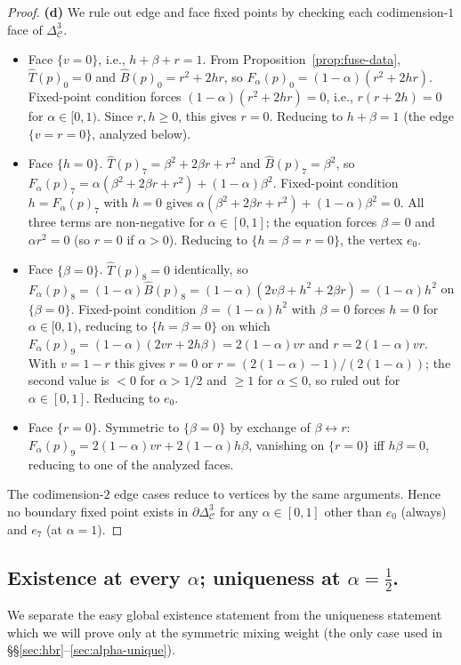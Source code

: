 \documentclass[11pt,reqno]{amsart}
\theoremstyle{plain}
\theoremstyle{definition}
\theoremstyle{remark}
\newcommand{\Cfour}{\mathcal{C}}
\newcommand{\Tfuse}{\widehat{T}}
\newcommand{\Bfuse}{\widehat{B}}
\begin{document}
\begin{proof}
\textbf{(d)} We rule out edge and face fixed points by checking
each codimension-$1$ face of $\Delta^{3}_{\Cfour}$.
\begin{itemize}\setlength\itemsep{0pt}
\item Face $\{v = 0\}$, i.e., $h + \beta + r = 1$. From
Proposition~\ref{prop:fuse-data}, $\Tfuse(p)_{0} = 0$ and
$\Bfuse(p)_{0} = r^{2} + 2hr$, so $F_{\alpha}(p)_{0} =
(1-\alpha)(r^{2} + 2hr)$. Fixed-point condition forces
$(1-\alpha)(r^{2} + 2hr) = 0$, i.e., $r(r + 2h) = 0$ for
$\alpha\in[0, 1)$. Since $r, h\geq 0$, this gives $r = 0$.
Reducing to $h + \beta = 1$ (the edge $\{v = r = 0\}$,
analyzed below).
\item Face $\{h = 0\}$. $\Tfuse(p)_{7} = \beta^{2} + 2\beta r +
r^{2}$ and $\Bfuse(p)_{7} = \beta^{2}$, so $F_{\alpha}(p)_{7} =
\alpha(\beta^{2} + 2\beta r + r^{2}) + (1-\alpha)\beta^{2}$.
Fixed-point condition $h = F_{\alpha}(p)_{7}$ with $h = 0$
gives $\alpha(\beta^{2} + 2\beta r + r^{2}) +
(1-\alpha)\beta^{2} = 0$. All three terms are non-negative for
$\alpha\in[0, 1]$; the equation forces $\beta = 0$ and
$\alpha r^{2} = 0$ (so $r = 0$ if $\alpha > 0$). Reducing to
$\{h = \beta = r = 0\}$, the vertex $e_{0}$.
\item Face $\{\beta = 0\}$. $\Tfuse(p)_{8} = 0$ identically, so
$F_{\alpha}(p)_{8} = (1-\alpha)\Bfuse(p)_{8} =
(1-\alpha)(2v\beta + h^{2} + 2\beta r) =
(1-\alpha)h^{2}$ on $\{\beta = 0\}$. Fixed-point condition
$\beta = (1-\alpha)h^{2}$ with $\beta = 0$ forces $h = 0$ for
$\alpha\in[0, 1)$, reducing to $\{h = \beta = 0\}$ on which
$F_{\alpha}(p)_{9} = (1-\alpha)(2vr + 2h\beta) =
2(1-\alpha)vr$ and $r = 2(1-\alpha)vr$. With $v = 1 - r$ this
gives $r = 0$ or $r = (2(1-\alpha) - 1)/(2(1-\alpha))$; the
second value is $< 0$ for $\alpha > 1/2$ and $\geq 1$ for
$\alpha \leq 0$, so ruled out for $\alpha\in[0, 1]$. Reducing
to $e_{0}$.
\item Face $\{r = 0\}$. Symmetric to $\{\beta = 0\}$ by exchange
of $\beta\leftrightarrow r$: $F_{\alpha}(p)_{9} = 2(1-\alpha)
v r + 2(1-\alpha) h\beta$, vanishing on $\{r = 0\}$ iff
$h\beta = 0$, reducing to one of the analyzed faces.
\end{itemize}
The codimension-$2$ edge cases reduce to vertices by the same
arguments. Hence no boundary fixed point exists in
$\partial\Delta^{3}_{\Cfour}$ for any $\alpha\in[0, 1]$ other
than $e_{0}$ (always) and $e_{7}$ (at $\alpha = 1$).
\end{proof}

\subsection{Existence at every $\alpha$; uniqueness at
$\alpha = \tfrac12$.} We separate the easy global existence
statement from the uniqueness statement which we will prove only
at the symmetric mixing weight (the only case used in
\S\S\ref{sec:hbr}--\ref{sec:alpha-unique}).
\end{document}
